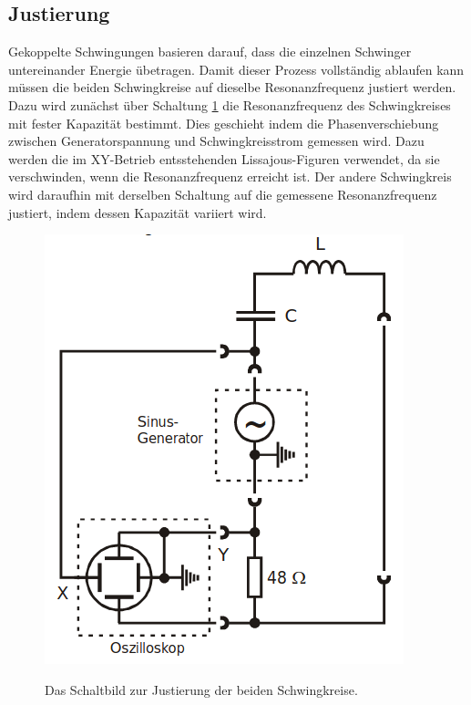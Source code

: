 \documentclass[titlepage = firstcover]{scrartcl}
\begin{document}
    \subsection{Justierung}
        Gekoppelte Schwingungen basieren darauf, dass die einzelnen Schwinger untereinander Energie übetragen. Damit dieser Prozess vollständig ablaufen kann
        müssen die beiden Schwingkreise auf dieselbe Resonanzfrequenz justiert werden. Dazu wird zunächst über Schaltung \ref{fig:Justierung} die 
        Resonanzfrequenz des Schwingkreises mit fester Kapazität bestimmt. Dies geschieht indem die Phasenverschiebung zwischen Generatorspannung und 
        Schwingkreisstrom gemessen wird. Dazu werden die im XY-Betrieb entsstehenden Lissajous-Figuren verwendet, da sie verschwinden, wenn die 
        Resonanzfrequenz erreicht ist. Der andere Schwingkreis wird daraufhin mit derselben Schaltung auf die gemessene Resonanzfrequenz justiert, indem 
        dessen Kapazität variiert wird.
        \begin{figure}[h]
            \centering
            \caption{Das Schaltbild zur Justierung der beiden Schwingkreise.}
            \includegraphics[width = 0.4\linewidth]{Justierung.png}
            \label{fig:Justierung}
          \end{figure}
\end{document}

